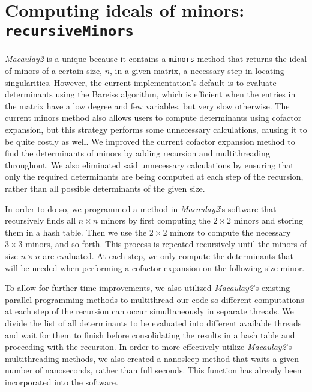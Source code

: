 \documentclass[11pt]{amsart}
\begin{document}
\section{Computing ideals of minors: {\tt recursiveMinors}}
\label{sec.RecursiveMinors}
\emph{Macaulay2} is a unique because it contains a {\tt minors} method that returns the ideal 
of minors of a certain size, $n$,  in a given matrix, a necessary step in 
locating singularities. However, the current implementation’s default is to 
evaluate determinants using the Bareiss algorithm, which is efficient when 
the entries in the matrix have a low degree and few variables, but very slow 
otherwise. The current minors method also allows users to compute determinants 
using cofactor expansion, but this strategy performs some unnecessary calculations, 
causing it to be quite costly as well. We improved the current cofactor 
expansion method to find the determinants of minors by adding recursion and 
multithreading throughout. We also eliminated said unnecessary calculations by 
ensuring that only the required determinants are being computed at each step 
of the recursion, rather than all possible determinants of the given size.

\par In order to do so, we programmed a method in \emph{Macaulay2}’s software that 
recursively finds all $n \times n$ minors by first computing the $2 \times 2$ minors 
and storing them in a hash table. Then we use the $2 \times 2$ minors to compute the 
necessary $3 \times 3$ minors, and so forth. This process is repeated recursively until 
the minors of size $n \times n$ are evaluated. At each step, we only compute the 
determinants that will be needed when performing a cofactor expansion on the 
following size minor.

\par To allow for further time improvements, we also utilized \emph{Macaulay2}’s existing 
parallel programming methods to multithread our code so different computations 
at each step of the recursion can occur simultaneously in separate threads. We 
divide the list of all determinants to be evaluated into different available 
threads and wait for them to finish before consolidating the results in a hash 
table and proceeding with the recursion. In order to more effectively utilize 
\emph{Macaulay2}'s multithreading methods, we also created a nanosleep method that 
waits a given number of nanoseconds, rather than full seconds. This function has already 
been incorporated into the software. 
\end{document}
